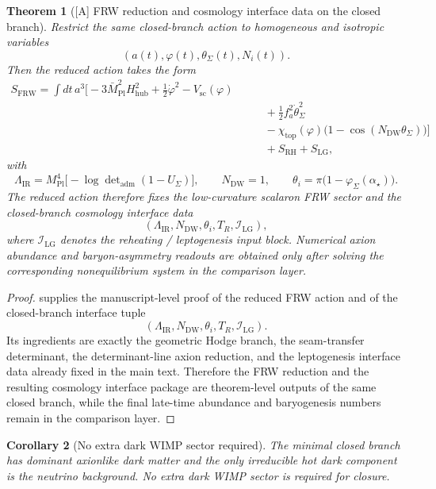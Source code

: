\documentclass[11pt,a4paper]{article}
\newtheorem{theorem}{Theorem}[section]
\newtheorem{corollary}[theorem]{Corollary}
\theoremstyle{definition}
\theoremstyle{remark}
\newcommand{\Mpl}{\bar M_{\mathrm{Pl}}}
\newcommand{\Mplunred}{M_{\mathrm{Pl}}}
\newcommand{\phiseam}{\varphi_{\Sigma}}
\newcommand{\Hhub}{H_{\mathrm{hub}}}
\begin{document}
\begin{theorem}[\textnormal{[A]} FRW reduction and cosmology interface data on the closed branch]
\label{thm:frw-cosmology-derivation}
Restrict the same closed-branch action to homogeneous and isotropic variables
\[
(a(t),\varphi(t),\theta_\Sigma(t),N_i(t)).
\]
Then the reduced action takes the form
\[
\begin{aligned}
S_{\mathrm{FRW}}
=
\int dt\,a^3\Big[
-3\Mpl^2\Hhub^2
+\frac12\dot\varphi^2
-V_{\mathrm{sc}}(\varphi)
\\
&\qquad
+\frac12 f_a^2\dot\theta_\Sigma^2
\\
&\qquad
-\chi_{\mathrm{top}}(\varphi)\bigl(1-\cos(N_{\mathrm{DW}}\theta_\Sigma)\bigr)
\Big]
\\
&\qquad
+S_{\mathrm{RH}}+S_{\mathrm{LG}},
\end{aligned}
\]
with
\[
\Lambda_{\mathrm{IR}}
=
\Mplunred^4\bigl[-\log\det\nolimits_{\mathrm{adm}}(1-U_\Sigma)\bigr],
\qquad
N_{\mathrm{DW}}=1,
\qquad
\theta_i=\pi\bigl(1-\phiseam(\alpha_\star)\bigr).
\]
The reduced action therefore fixes the low-curvature scalaron FRW sector and the closed-branch
cosmology interface data
\[
(\Lambda_{\mathrm{IR}},N_{\mathrm{DW}},\theta_i,T_R,\mathcal I_{\mathrm{LG}}),
\]
where $\mathcal I_{\mathrm{LG}}$ denotes the reheating / leptogenesis input block. Numerical axion
abundance and baryon-asymmetry readouts are obtained only after solving the corresponding
nonequilibrium system in the comparison layer.
\end{theorem}

\begin{proof}
 supplies the manuscript-level proof of the reduced FRW action
and of the closed-branch interface tuple
\[
(\Lambda_{\mathrm{IR}},N_{\mathrm{DW}},\theta_i,T_R,\mathcal I_{\mathrm{LG}}).
\]
Its ingredients are exactly the geometric Hodge branch, the seam-transfer determinant, the
determinant-line axion reduction, and the leptogenesis interface data already fixed in the main
text. Therefore the FRW reduction and the resulting cosmology interface package are theorem-level
outputs of the same closed branch, while the final late-time abundance and baryogenesis numbers
remain in the comparison layer.
\end{proof}

\begin{corollary}[No extra dark WIMP sector required]
The minimal closed branch has dominant axionlike dark matter and the only
irreducible hot dark component is the neutrino background. No extra dark WIMP sector is required
for closure.
\end{corollary}
\end{document}
